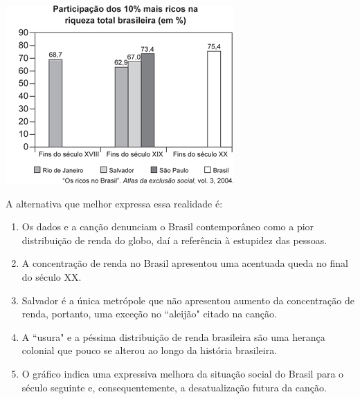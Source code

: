 \documentclass[10pt,a4paper]{article}
\newenvironment{Figure}
  {\par\medskip\noindent\minipage{\linewidth}}
  {\endminipage\par\medskip}
\begin{document}
\begin{multicols}{2}
\begin{enumerate}
\begin{Figure}
     \includegraphics[width=\linewidth]{participacao_10_ricos_geografia.jpg}
\end{Figure}
	A alternativa que melhor expressa essa realidade \'e:
		\begin{enumerate}
		\item Os dados e a can\c{c}\~ao denunciam o Brasil contemporâneo como a pior distribui\c{c}\~ao de renda do globo, da\'i a refer\^encia \`a estupidez das pessoas.
		\item  A concentra\c{c}\~ao de renda no Brasil apresentou uma acentuada queda no final do s\'eculo XX.
		\item Salvador \'e a \'unica metr\'opole que n\~ao apresentou aumento da concentra\c{c}\~ao de renda, portanto, uma exce\c{c}\~ao no ``aleij\~ao" citado na can\c{c}\~ao.
		\item A ``usura" e a p\'essima distribui\c{c}\~ao de renda brasileira s\~ao uma heran\c{c}a colonial que pouco se alterou ao longo da hist\'oria brasileira.
		\item O gr\'afico indica uma expressiva melhora da situa\c{c}\~ao social do Brasil para o s\'eculo seguinte e, consequentemente, a desatualiza\c{c}\~ao futura da can\c{c}\~ao.
		\end{enumerate}


\end{enumerate}
\end{multicols}
\end{document}
